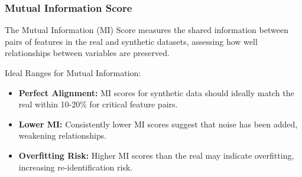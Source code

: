 \documentclass[
  letterpaper,
  DIV=11,
  numbers=noendperiod]{scrartcl}
\providecommand{\tightlist}{%
  \setlength{\itemsep}{0pt}\setlength{\parskip}{0pt}}\usepackage{longtable,booktabs,array}
\begin{document}
\subsubsection{Mutual Information Score}\label{mutual-information-score}

The Mutual Information (MI) Score measures the shared information
between pairs of features in the real and synthetic datasets, assessing
how well relationships between variables are preserved.

Ideal Ranges for Mutual Information:

\begin{itemize}
\tightlist
\item
  \textbf{Perfect Alignment:} MI scores for synthetic data should
  ideally match the real within 10-20\% for critical feature pairs.
\item
  \textbf{Lower MI:} Consistently lower MI scores suggest that noise has
  been added, weakening relationships.
\item
  \textbf{Overfitting Risk:} Higher MI scores than the real may indicate
  overfitting, increasing re-identification risk.
\end{itemize}
\end{document}
